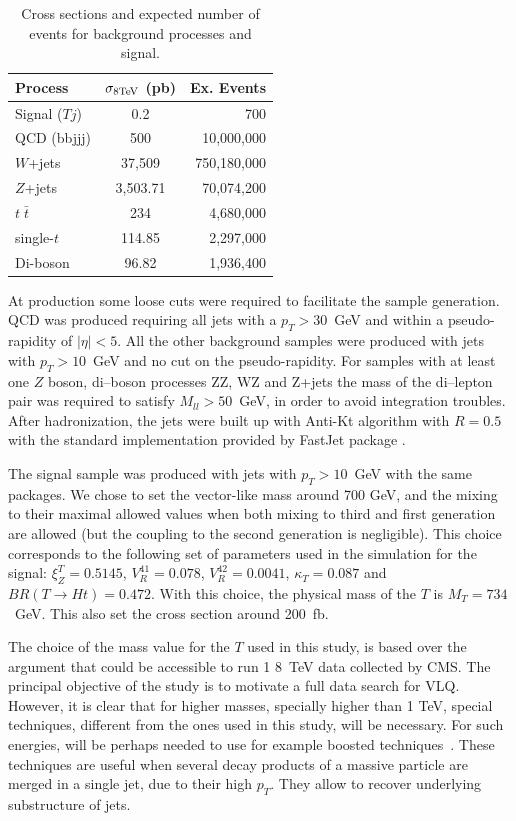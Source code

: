 \begin{table}[htbH]
\label{tab:xsec}
\begin{center}
\begin{tabular}{||l|c|r||}
  \hline\hline
  Process & $\sigma_{\rm 8 TeV}$ (pb) & Ex. Events \\ \hline
 Signal ($Tj$) & 0.2 & 700 \\
 \hline
  QCD (bbjjj) & 500 & 10,000,000 \\
  $W$+jets & 37,509 & 750,180,000 \\
  $Z$+jets & 3,503.71 & 70,074,200 \\ 
  $t\; \bar{t}$ & 234 & 4,680,000 \\
  single-$t$ & 114.85 & 2,297,000 \\
  Di-boson & 96.82 & 1,936,400 \\
  \hline\hline
\end{tabular}
\caption{Cross sections and expected number of events for background processes and signal.}
\end{center}
\end{table}

At production some loose cuts were required to facilitate the sample generation. QCD was produced requiring all jets with a $p_{T}>30$~GeV and within a pseudo-rapidity of $|\eta|<5$. All the other background samples were produced with jets with $p_{T}>10$~GeV and no cut on the pseudo-rapidity. For samples with at least one $Z$ boson, di--boson processes ZZ, WZ and Z+jets the mass of the di--lepton pair was required to satisfy $M_{ll}>50$~GeV, in order to avoid integration troubles. After hadronization, the jets were built up with Anti-Kt algorithm with $R=0.5$ with the standard implementation provided by FastJet package \cite{Cacciari:2011ma}.

The signal sample was produced with jets with $p_{T}>10$~GeV with the same packages. We chose to set the vector-like mass around 700 GeV, and the mixing to their maximal allowed values when both mixing to third and first generation are allowed (but the coupling to the second generation is negligible). This choice corresponds to the following set of parameters used in the simulation for the signal: $\xi_Z^{T}=0.5145$, $V_{R}^{41}=0.078$, $V_{R}^{42}=0.0041$, $\kappa_{T}=0.087$ and $BR(T \to H t)=0.472$. With this choice, the physical mass of the $T$ is $M_{T}=734$~GeV. This also set the cross section around 200~fb. 

The choice of the mass value for the $T$ used in this study, is based over the argument that could be accessible to run 1 8~TeV data collected by CMS. The principal objective of the study is to motivate a full data search for VLQ. However, it is clear that for higher masses, specially higher than 1 TeV, special techniques, different from the ones used in this study, will be necessary. For such energies, will be perhaps needed to use for example boosted techniques~\cite{CMS:2013vca, ATLAS-CONF-2013-084, Usai:2015vva}. These techniques are useful when several decay products of a massive particle are merged in a single jet, due to their high $p_{T}$. They allow to recover underlying substructure of jets. 

